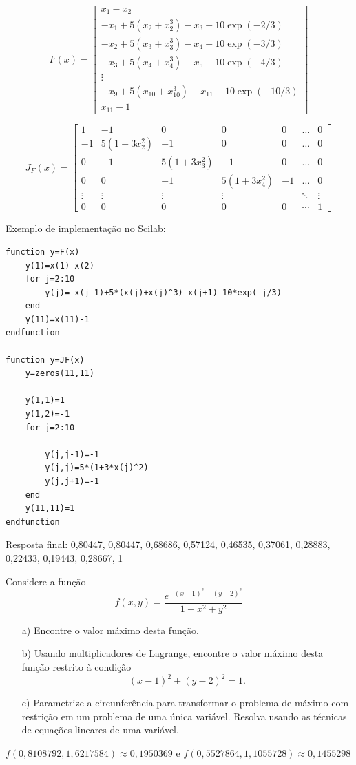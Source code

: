 \begin{resp}
$$F\left(x\right)=\left[
\begin{array}{c}
x_1-x_2\\[.2cm]
-x_{1}+5(x_2+x_2^3)-x_{3}-10\exp(-2/3)\\[.2cm]
-x_{2}+5(x_3+x_3^3)-x_{4}-10\exp(-3/3)\\[.2cm]
-x_{3}+5(x_4+x_4^3)-x_{5}-10\exp(-4/3)\\[.2cm]
\vdots\\
-x_{9}+5(x_{10}+x_{10}^3)-x_{11}-10\exp(-10/3)\\[.2cm]
x_{11}-1
\end{array}\right] $$

$$J_F(x)=\left[
\begin{array}{ccccccc}
1& -1 &0 &0 &0&\ldots & 0\\[.2cm]
-1&5(1+3x_2^2)& -1&0&0&\ldots & 0\\[.2cm]
0&-1&5(1+3x_3^2)& -1&0&\ldots & 0\\[.2cm]
0&0&-1&5(1+3x_4^2)& -1&\ldots & 0\\[.2cm]
\vdots &\vdots &\vdots &\vdots &&\ddots&\vdots\\[.2cm]
0&0&0&0&0&\cdots&1
\end{array}
\right]
$$

\ifisscilab
Exemplo de implementação no Scilab:
\begin{verbatim}
function y=F(x)
    y(1)=x(1)-x(2)
    for j=2:10
        y(j)=-x(j-1)+5*(x(j)+x(j)^3)-x(j+1)-10*exp(-j/3)
    end
    y(11)=x(11)-1
endfunction

function y=JF(x)
    y=zeros(11,11)

    y(1,1)=1
    y(1,2)=-1
    for j=2:10

        y(j,j-1)=-1
        y(j,j)=5*(1+3*x(j)^2)
        y(j,j+1)=-1
    end
    y(11,11)=1
endfunction
\end{verbatim}
\fi

Resposta final: 0,80447, 0,80447, 0,68686, 0,57124, 0,46535,
0,37061, 0,28883, 0,22433, 0,19443, 0,28667,  1
\end{resp}


\begin{exer} Considere a função
$$f(x,y)=\frac{e^{-(x-1)^2-(y-2)^2}}{1+x^2+y^2}$$
\begin{itemize}
\item[a)] Encontre o valor máximo desta função.
\item[b)] Usando multiplicadores de Lagrange, encontre o valor máximo desta função restrito à condição $$(x-1)^2+(y-2)^2=1.$$
\item[c)] Parametrize a circunferência para transformar o problema de máximo com restrição em um problema de uma única variável. Resolva usando as técnicas de equações lineares de uma variável.
\end{itemize}

\end{exer}
\begin{resp}
$f(0,8108792, 1,6217584)\approx 0,1950369$ e $f(0,5527864, 1,1055728 )\approx 0,1455298 $
\end{resp}



